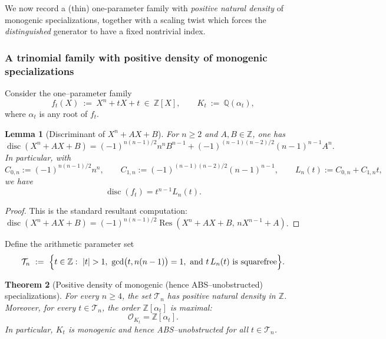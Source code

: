 \documentclass[11pt,letterpaper]{amsart}
\newcommand{\Z}{\mathbb{Z}}
\newcommand{\Q}{\mathbb{Q}}
\newcommand{\Ocal}{\mathcal{O}}
\newcommand{\disc}{\operatorname{disc}}
\newcommand{\Res}{\operatorname{Res}}
\theoremstyle{plain}
\newtheorem{theorem}{Theorem}[section]
\newtheorem{lemma}[theorem]{Lemma}
\theoremstyle{definition}
\theoremstyle{remark}
\theoremstyle{plain}
\begin{document}
We now record a (thin) one-parameter family with \emph{positive natural density} of monogenic specializations,
together with a scaling twist which forces the \emph{distinguished} generator to have a fixed nontrivial index.


\subsubsection{A trinomial family with positive density of monogenic specializations}

Consider the one--parameter family
\[
f_t(X)\ :=\ X^n+tX+t\ \in\ \Z[X],\qquad K_t\ :=\ \Q(\alpha_t),
\]
where $\alpha_t$ is any root of $f_t$.

\begin{lemma}[Discriminant of $X^n+AX+B$]
\label{lem:trinomial-disc}
For $n\ge 2$ and $A,B\in\Z$, one has
\[
\disc(X^n+AX+B)
=
(-1)^{n(n-1)/2}n^n B^{n-1}
+
(-1)^{(n-1)(n-2)/2}(n-1)^{n-1}A^n.
\]
In particular, with
\[
C_{0,n}:=(-1)^{n(n-1)/2}n^n,\qquad C_{1,n}:=(-1)^{(n-1)(n-2)/2}(n-1)^{n-1},
\qquad
L_n(t):=C_{0,n}+C_{1,n}t,
\]
we have
\begin{equation}
\label{eq:disc-ft}
\disc(f_t)=t^{n-1}L_n(t).
\end{equation}
\end{lemma}

\begin{proof}
This is the standard resultant computation:
$\disc(X^n+AX+B)=(-1)^{n(n-1)/2}\Res(X^n+AX+B,\,nX^{n-1}+A)$.
\end{proof}

Define the arithmetic parameter set
\[
\mathcal T_n\ :=\ \Bigl\{t\in\Z:\ |t|>1,\ \gcd\bigl(t,n(n-1)\bigr)=1,\ \text{and }t\,L_n(t)\text{ is squarefree}\Bigr\}.
\]

\begin{theorem}[Positive density of monogenic (hence \textsc{ABS}--unobstructed) specializations]
\label{thm:ft-monogenic-positive-density}
For every $n\ge 4$, the set $\mathcal T_n$ has positive natural density in $\Z$.
Moreover, for every $t\in\mathcal T_n$, the order $\Z[\alpha_t]$ is maximal:
\[
\Ocal_{K_t}=\Z[\alpha_t].
\]
In particular, $K_t$ is monogenic and hence \textsc{ABS}--unobstructed for all $t\in\mathcal T_n$.
\end{theorem}
\end{document}

